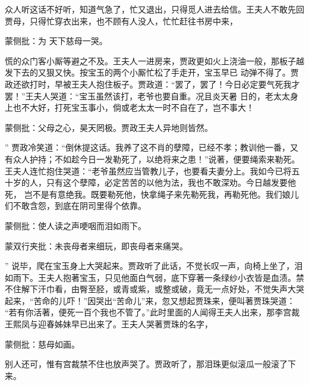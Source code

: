 \begin{parag}
    众人听这话不好听，知道气急了，忙又退出，只得觅人进去给信。王夫人不敢先回贾母，只得忙穿衣出来，也不顾有人没人，忙忙赶往书房中来，\begin{note}蒙侧批：为 天下慈母一哭。\end{note}慌的众门客小厮等避之不及。王夫人一进房来，贾政更如火上浇油一般，那板子越发下去的又狠又快。按宝玉的两个小厮忙松了手走开，宝玉早已 动弹不得了。贾政还欲打时，早被王夫人抱住板子。贾政道：“罢了，罢了！今日必定要气死我才罢！”王夫人哭道：“宝玉虽然该打，老爷也要自重。况且炎天暑 日的，老太太身上也不大好，打死宝玉事小，倘或老太太一时不自在了，岂不事大！\begin{note}蒙侧批：父母之心，昊天罔极。贾政王夫人异地则皆然。\end{note}” 贾政冷笑道：“倒休提这话。我养了这不肖的孽障，已经不孝；教训他一番，又有众人护持；不如趁今日一发勒死了，以绝将来之患！”说著，便要绳索来勒死。王夫人连忙抱住哭道：“老爷虽然应当管教儿子，也要看夫妻分上。我如今已将五十岁的人，只有这个孽障，必定苦苦的以他为法，我也不敢深劝。今日越发要他死， 岂不是有意绝我。既要勒死他，快拿绳子来先勒死我，再勒死他。我们娘儿们不敢含怨，到底在阴司里得个依靠。\begin{note}蒙侧批：使人读之声哽咽而泪如雨下。\end{note}\begin{note}蒙双行夹批：未丧母者来细玩，即丧母者来痛哭。\end{note}” 说毕，爬在宝玉身上大哭起来。贾政听了此话，不觉长叹一声，向椅上坐了，泪如雨下。王夫人抱著宝玉，只见他面白气弱，底下穿著一条绿纱小衣皆是血渍。禁不住解下汗巾看，由臀至胫，或青或紫，或整或破，竟无一点好处，不觉失声大哭起来，“苦命的儿吓！”因哭出“苦命儿”来，忽又想起贾珠来，便叫著贾珠哭道： “若有你活著，便死一百个我也不管了。”此时里面的人闻得王夫人出来，那李宫裁王熙凤与迎春姊妹早已出来了。王夫人哭著贾珠的名字，\begin{note}蒙侧批：慈母如画。\end{note}别人还可，惟有宫裁禁不住也放声哭了。贾政听了，那泪珠更似滚瓜一般滚了下来。
\end{parag}


